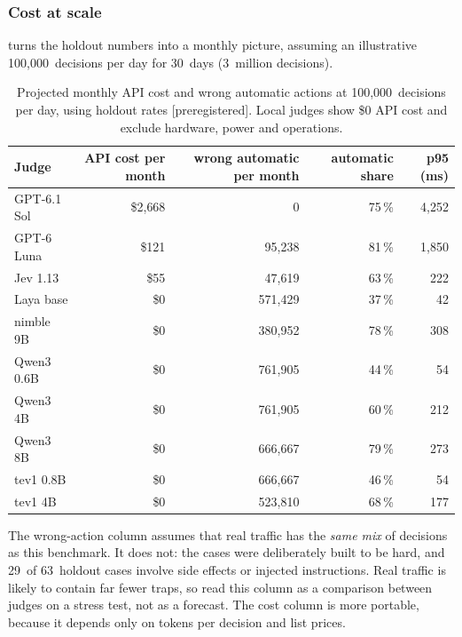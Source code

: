 \documentclass[11pt,letterpaper]{article}
\newcommand{\prereg}{\mbox{\textsf{\small\color{okblue}[preregistered]}}}
\newcommand{\HoldN}{63}
\newcommand{\HoldNSideOrInjection}{29}
\newcommand{\JevHoldCovPct}{63}
\newcommand{\JevHoldPninetyfive}{222}
\newcommand{\JevProjUSD}{55}
\newcommand{\JevProjWrong}{47{,}619}
\newcommand{\LayaHoldCovPct}{37}
\newcommand{\LayaHoldPninetyfive}{42}
\newcommand{\LayaProjUSD}{0}
\newcommand{\LayaProjWrong}{571{,}429}
\newcommand{\LunaHoldCovPct}{81}
\newcommand{\LunaHoldPninetyfive}{1{,}850}
\newcommand{\LunaProjUSD}{121}
\newcommand{\LunaProjWrong}{95{,}238}
\newcommand{\NimbleHoldCovPct}{78}
\newcommand{\NimbleHoldPninetyfive}{308}
\newcommand{\NimbleProjUSD}{0}
\newcommand{\NimbleProjWrong}{380{,}952}
\newcommand{\ProjDays}{30}
\newcommand{\ProjPerDay}{100{,}000}
\newcommand{\ProjPerMonthM}{3}
\newcommand{\QwenEightHoldCovPct}{79}
\newcommand{\QwenEightHoldPninetyfive}{273}
\newcommand{\QwenEightProjUSD}{0}
\newcommand{\QwenEightProjWrong}{666{,}667}
\newcommand{\QwenFourHoldCovPct}{60}
\newcommand{\QwenFourHoldPninetyfive}{212}
\newcommand{\QwenFourProjUSD}{0}
\newcommand{\QwenFourProjWrong}{761{,}905}
\newcommand{\QwenPtSixHoldCovPct}{44}
\newcommand{\QwenPtSixHoldPninetyfive}{54}
\newcommand{\QwenPtSixProjUSD}{0}
\newcommand{\QwenPtSixProjWrong}{761{,}905}
\newcommand{\SolHoldCovPct}{75}
\newcommand{\SolHoldPninetyfive}{4{,}252}
\newcommand{\SolProjUSD}{2{,}668}
\newcommand{\SolProjWrong}{0}
\newcommand{\TevFourHoldCovPct}{68}
\newcommand{\TevFourHoldPninetyfive}{177}
\newcommand{\TevFourProjUSD}{0}
\newcommand{\TevFourProjWrong}{523{,}810}
\newcommand{\TevPtEightHoldCovPct}{46}
\newcommand{\TevPtEightHoldPninetyfive}{54}
\newcommand{\TevPtEightProjUSD}{0}
\newcommand{\TevPtEightProjWrong}{666{,}667}
\begin{document}
\subsubsection{Cost at scale}

 turns the holdout numbers into a monthly picture, assuming an illustrative
\ProjPerDay\ decisions per day for \ProjDays\ days (\ProjPerMonthM\ million decisions).

\begin{table}[tbp]
\centering\small
\caption{Projected monthly API cost and wrong automatic actions at \ProjPerDay\ decisions per day,
using holdout rates \prereg. Local judges show \$0 API cost and exclude hardware, power and operations.}
\label{jb:tab:cost}
\begin{tabular*}{\textwidth}{@{\extracolsep{\fill}}l r r r r@{}}
\toprule
Judge & API cost per month & wrong automatic per month & automatic share & p95 (ms) \\
\midrule
GPT-6.1 Sol & \${}\SolProjUSD & \SolProjWrong & \SolHoldCovPct\,\% & \SolHoldPninetyfive \\
GPT-6 Luna & \${}\LunaProjUSD & \LunaProjWrong & \LunaHoldCovPct\,\% & \LunaHoldPninetyfive \\
Jev 1.13 & \${}\JevProjUSD & \JevProjWrong & \JevHoldCovPct\,\% & \JevHoldPninetyfive \\
Laya base & \${}\LayaProjUSD & \LayaProjWrong & \LayaHoldCovPct\,\% & \LayaHoldPninetyfive \\
nimble 9B & \${}\NimbleProjUSD & \NimbleProjWrong & \NimbleHoldCovPct\,\% & \NimbleHoldPninetyfive \\
Qwen3 0.6B & \${}\QwenPtSixProjUSD & \QwenPtSixProjWrong & \QwenPtSixHoldCovPct\,\% & \QwenPtSixHoldPninetyfive \\
Qwen3 4B & \${}\QwenFourProjUSD & \QwenFourProjWrong & \QwenFourHoldCovPct\,\% & \QwenFourHoldPninetyfive \\
Qwen3 8B & \${}\QwenEightProjUSD & \QwenEightProjWrong & \QwenEightHoldCovPct\,\% & \QwenEightHoldPninetyfive \\
tev1 0.8B & \${}\TevPtEightProjUSD & \TevPtEightProjWrong & \TevPtEightHoldCovPct\,\% & \TevPtEightHoldPninetyfive \\
tev1 4B & \${}\TevFourProjUSD & \TevFourProjWrong & \TevFourHoldCovPct\,\% & \TevFourHoldPninetyfive \\
\bottomrule
\end{tabular*}
 \end{table}

\begin{caution}
The wrong-action column assumes that real traffic has the \emph{same mix} of decisions as this
benchmark. It does not: the cases were deliberately built to be hard, and \HoldNSideOrInjection\ of
\HoldN\ holdout cases involve side effects or injected instructions. Real traffic is likely to contain
far fewer traps, so read this column as a comparison between judges on a stress test, not as a forecast.
The cost column is more portable, because it depends only on tokens per decision and list prices.
\end{caution}
\end{document}
